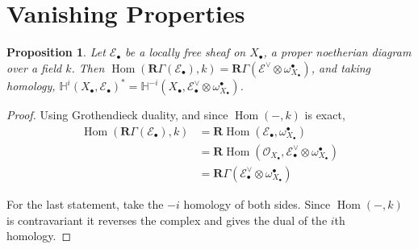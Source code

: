 \documentclass{report}
\newtheorem{prop}[theorem]{Proposition}
\theoremstyle{definition}
\DeclareMathOperator{\Hom}{Hom}
\newcommand{\EE}{\mathscr{E}}
\newcommand{\HH}{\mathbb{H}}
\newcommand{\OO}{\mathcal{O}}
\newcommand{\bR}{\textbf{R}}
\begin{document}
\section{Vanishing Properties}

\begin{prop}
	\label{prp:cohofdual}
	Let $\EE_\bullet$ be a locally free sheaf on $X_\bullet$, a proper noetherian diagram over a field $k$.
	Then $\Hom(\bR \Gamma(\EE_\bullet),k) = \bR \Gamma(\EE^\vee \otimes \omega_{X_\bullet}^\bullet)$, and taking homology,
	$\HH^i (X_\bullet, \EE_\bullet)^* = \HH^{-i}(X_\bullet, \EE_\bullet^\vee \otimes \omega_{X_\bullet}^\bullet)$.
\end{prop}
\begin{proof}
	Using Grothendieck duality, and since $\Hom(-,k)$ is exact,
	\begin{align*}
		\Hom(\bR \Gamma(\EE_\bullet),k) &= \bR \Hom(\EE_\bullet, \omega_{X_\bullet}^\bullet) \\
		&= \bR \Hom(\OO_{X_\bullet}, \EE_\bullet^\vee \otimes \omega_{X_\bullet}^\bullet) \\
		&= \bR \Gamma(\EE_\bullet^\vee \otimes \omega_{X_\bullet}^\bullet)
	\end{align*}
	
	For the last statement, take the $-i$ homology of both sides.
	Since $\Hom(-,k)$ is contravariant it reverses the complex and gives the dual of the $i$th homology.
\end{proof}
\end{document}
